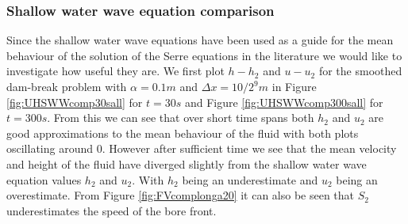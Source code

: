 \documentclass[SingleSpace,12pt,Proceedings]{Serre_ASCE}
\begin{document}
\subsubsection{Shallow water wave equation comparison}
Since the shallow water wave equations have been used as a guide for the mean behaviour of the solution of the Serre equations in the literature \cite{Hank-etal-2010-2034,Mitsotakis-etal-2014} we would like to investigate how useful they are. 
We first plot $h - h_2$ and $u - u_2$ for the smoothed dam-break problem with $\alpha = 0.1m$ and $\Delta x = {10}/{2^9}m$ in Figure \ref{fig:UHSWWcomp30sall} for $t= 30s$ and Figure \ref{fig:UHSWWcomp300sall} for $t= 300s$. From this we can see that over short time spans both $h_2$ and $u_2$ are good approximations to the mean behaviour of the fluid with both plots oscillating around $0$. However after sufficient time we see that the mean velocity and height of the fluid have diverged slightly from the shallow water wave equation values $h_2$ and $u_2$. With $h_2$ being an underestimate and $u_2$ being an overestimate. From Figure \ref{fig:FVcomplonga20} it can also be seen that $S_2$ underestimates the speed of the bore front.
\end{document}
